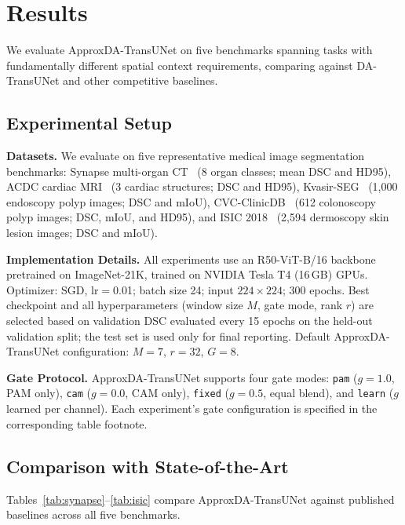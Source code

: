 \section{Results}
\label{sec:experiments}

We evaluate ApproxDA-TransUNet on five benchmarks spanning tasks with fundamentally different spatial context requirements, comparing against DA-TransUNet and other competitive baselines.

\subsection{Experimental Setup}

\textbf{Datasets.} We evaluate on five representative medical image segmentation benchmarks: Synapse multi-organ CT~\cite{landman2015miccai} (8 organ classes; mean DSC and HD95), ACDC cardiac MRI~\cite{bernard2018deep} (3 cardiac structures; DSC and HD95), Kvasir-SEG~\cite{jha2020kvasir} (1,000 endoscopy polyp images; DSC and mIoU), CVC-ClinicDB~\cite{bernal2015cvc} (612 colonoscopy polyp images; DSC, mIoU, and HD95), and ISIC 2018~\cite{codella2019isic} (2,594 dermoscopy skin lesion images; DSC and mIoU).

\textbf{Implementation Details.} All experiments use an R50-ViT-B/16 backbone pretrained on ImageNet-21K, trained on NVIDIA Tesla T4 (16\,GB) GPUs. Optimizer: SGD, lr$=$0.01; batch size 24; input $224{\times}224$; 300 epochs. Best checkpoint and all hyperparameters (window size $M$, gate mode, rank $r$) are selected based on validation DSC evaluated every 15 epochs on the held-out validation split; the test set is used only for final reporting. Default ApproxDA-TransUNet configuration: $M{=}7$, $r{=}32$, $G{=}8$.

\textbf{Gate Protocol.} ApproxDA-TransUNet supports four gate modes: \texttt{pam} ($g{=}1.0$, PAM only), \texttt{cam} ($g{=}0.0$, CAM only), \texttt{fixed} ($g{=}0.5$, equal blend), and \texttt{learn} ($g$ learned per channel). Each experiment's gate configuration is specified in the corresponding table footnote.

\subsection{Comparison with State-of-the-Art}

Tables~\ref{tab:synapse}--\ref{tab:isic} compare ApproxDA-TransUNet against published baselines across all five benchmarks.

